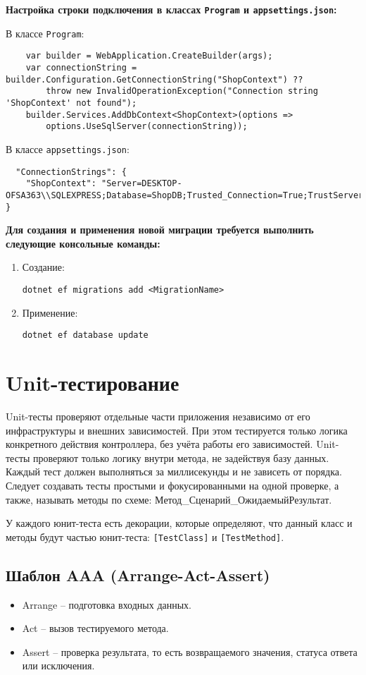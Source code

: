 \documentclass[a4paper,12pt]{report}
\begin{document}
\textbf{Настройка строки подключения в классах \texttt{Program} и \texttt{appsettings.json}:}

В классе \texttt{Program}:
\begin{verbatim}
    var builder = WebApplication.CreateBuilder(args);
    var connectionString = builder.Configuration.GetConnectionString("ShopContext") ??
        throw new InvalidOperationException("Connection string 'ShopContext' not found");
    builder.Services.AddDbContext<ShopContext>(options =>
        options.UseSqlServer(connectionString));
\end{verbatim}

В классе \texttt{appsettings.json}:
\begin{verbatim}
  "ConnectionStrings": {
    "ShopContext": "Server=DESKTOP-OFSA363\\SQLEXPRESS;Database=ShopDB;Trusted_Connection=True;TrustServerCertificate=True;"
}
\end{verbatim}

\textbf{Для создания и применения новой миграции требуется выполнить следующие консольные команды:}
\begin{enumerate}
    \item
        Создание:

        \texttt{dotnet ef migrations add <MigrationName>}
    \item
        Применение:

        \texttt{dotnet ef database update}
\end{enumerate}

\section{Unit-тестирование}

Unit-тесты проверяют отдельные части приложения независимо от его инфраструктуры и внешних зависимостей. 
При этом тестируется только логика конкретного действия контроллера, без учёта работы его зависимостей.
Unit-тесты проверяют только логику внутри метода, не задействуя базу данных. Каждый тест должен выполняться 
за миллисекунды и не зависеть от порядка. Следует создавать тесты простыми и фокусированными на одной проверке, 
а также, называть методы по схеме: Метод\_Сценарий\_ОжидаемыйРезультат.

У каждого юнит-теста есть декорации, которые определяют, что данный класс и методы будут частью юнит-теста: 
\texttt{[TestClass]} и \texttt{[TestMethod]}.

\subsection{Шаблон AAA (Arrange-Act-Assert)}
\begin{itemize}
    \item
        Arrange -- подготовка входных данных.
    \item
        Act -- вызов тестируемого метода.
    \item
        Assert -- проверка результата, то есть возвращаемого значения, статуса ответа или исключения.
\end{itemize}
\end{document}
